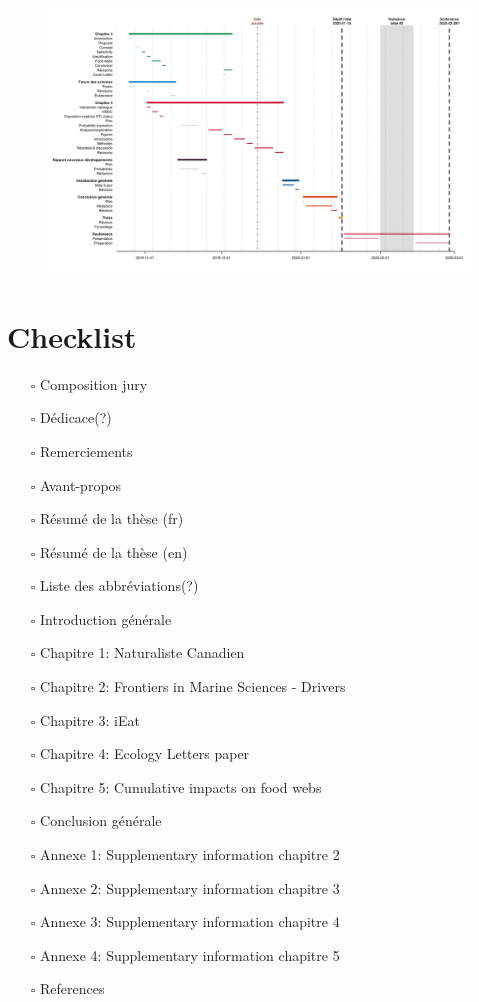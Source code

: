 \blandscape
\begin{figure}[H]
\centering
\includegraphics[width=\columnwidth]{./timeline.png}
\label{timeline}
\end{figure}
\elandscape
\newpage

\hypertarget{checklist}{%
\section{Checklist}\label{checklist}}

\begin{itemize}
\tightlist
\item[$\square$]
  Composition jury
\item[$\square$]
  Dédicace(?)
\item[$\square$]
  Remerciements
\item[$\square$]
  Avant-propos
\item[$\square$]
  Résumé de la thèse (fr)
\item[$\square$]
  Résumé de la thèse (en)
\item[$\square$]
  Liste des abbréviations(?)
\item[$\square$]
  Introduction générale
\item[$\square$]
  Chapitre 1: Naturaliste Canadien
\item[$\square$]
  Chapitre 2: Frontiers in Marine Sciences - Drivers
\item[$\square$]
  Chapitre 3: iEat
\item[$\square$]
  Chapitre 4: Ecology Letters paper
\item[$\square$]
  Chapitre 5: Cumulative impacts on food webs
\item[$\square$]
  Conclusion générale
\item[$\square$]
  Annexe 1: Supplementary information chapitre 2
\item[$\square$]
  Annexe 2: Supplementary information chapitre 3
\item[$\square$]
  Annexe 3: Supplementary information chapitre 4
\item[$\square$]
  Annexe 4: Supplementary information chapitre 5
\item[$\square$]
  References
\end{itemize}

